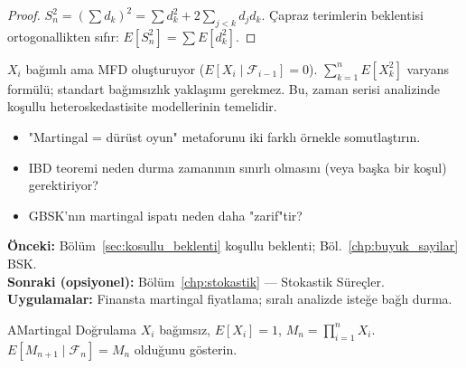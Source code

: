 \begin{proof}
$S_n^2 = (\sum d_k)^2 = \sum d_k^2 + 2\sum_{j<k} d_j d_k$.
Çapraz terimlerin beklentisi ortogonallikten sıfır: $E[S_n^2] = \sum E[d_k^2]$.
\end{proof}

\begin{ornek}
$X_i$ bağımlı ama MFD oluşturuyor ($E[X_i\mid\mathcal{F}_{i-1}]=0$).
$\sum_{k=1}^n E[X_k^2]$ varyans formülü; standart bağımsızlık yaklaşımı gerekmez.
Bu, zaman serisi analizinde koşullu heteroskedastisite modellerinin temelidir.
\end{ornek}

\begin{ozyansima}
\begin{itemize}
  \item "Martingal = dürüst oyun" metaforunu iki farklı örnekle somutlaştırın.
  \item IBD teoremi neden durma zamanının sınırlı olmasını (veya başka bir koşul) gerektiriyor?
  \item GBSK'nın martingal ispatı neden daha "zarif"tir?
\end{itemize}
\end{ozyansima}

\begin{kopru}
\textbf{Önceki:} Bölüm~\ref{sec:kosullu_beklenti} koşullu beklenti; Böl.~\ref{chp:buyuk_sayilar} BSK.\\
\textbf{Sonraki (opsiyonel):} Bölüm~\ref{chp:stokastik} --- Stokastik Süreçler.\\
\textbf{Uygulamalar:} Finansta martingal fiyatlama; sıralı analizde isteğe bağlı durma.
\end{kopru}


\cozumlualistirmalar

\begin{alistirma}[Al.9.1]{A}{Martingal Doğrulama}
$X_i$ bağımsız, $E[X_i]=1$, $M_n = \prod_{i=1}^n X_i$.
$E[M_{n+1}\mid\mathcal{F}_n] = M_n$ olduğunu gösterin.
\end{alistirma}

